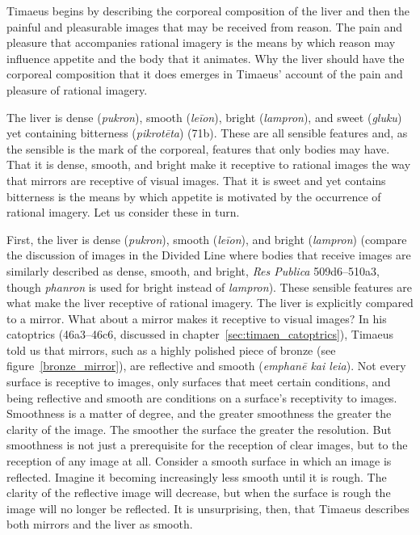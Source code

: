 Timaeus begins by describing the corporeal composition of the liver and then the painful and pleasurable images that may be received from reason. The pain and pleasure that accompanies rational imagery is the means by which reason may influence appetite and the body that it animates. Why the liver should have the corporeal composition that it does emerges in Timaeus' account of the pain and pleasure of rational imagery.

The liver is dense (\emph{pukron}), smooth (\emph{leīon}), bright (\emph{lampron}), and sweet (\emph{gluku}) yet containing bitterness (\emph{pikrotēta}) (71b). These are all sensible features and, as the sensible is the mark of the corporeal, features that only bodies may have. That it is dense, smooth, and bright make it receptive to rational images the way that mirrors are receptive of visual images. That it is sweet and yet contains bitterness is the means by which appetite is motivated by the occurrence of rational imagery. Let us consider these in turn.

First, the liver is dense (\emph{pukron}), smooth (\emph{leīon}), and bright (\emph{lampron}) (compare the discussion of images in the Divided Line where bodies that receive images are similarly described as dense, smooth, and bright, \emph{Res Publica} 509d6--510a3, though \emph{phanron} is used for bright instead of \emph{lampron}). These sensible features are what make the liver receptive of rational imagery. The liver is explicitly compared to a mirror. What about a mirror makes it receptive to visual images? In his catoptrics (46a3–46c6, discussed in chapter~\ref{sec:timaen_catoptrics}), Timaeus told us that mirrors, such as a highly polished piece of bronze (see figure~\ref{bronze_mirror}), are reflective and smooth (\emph{emphanē kai leia}). Not every surface is receptive to images, only surfaces that meet certain conditions, and being reflective and smooth are conditions on a surface's receptivity to images. Smoothness is a matter of degree, and the greater smoothness the greater the clarity of the image. The smoother the surface the greater the resolution. But smoothness is not just a prerequisite for the reception of clear images, but to the reception of any image at all. Consider a smooth surface in which an image is reflected. Imagine it becoming increasingly less smooth until it is rough. The clarity of the reflective image will decrease, but when the surface is rough the image will no longer be reflected. It is unsurprising, then, that Timaeus describes both mirrors and the liver as smooth. 


